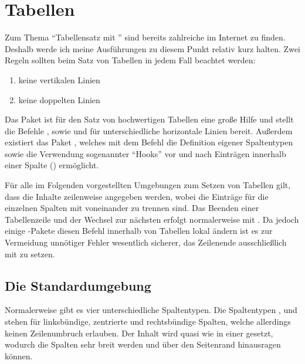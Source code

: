 \documentclass[%
  english,ngerman,%
  geometry=no,DIV=12,automark,%
]{tudscrartcl}
\begin{document}
\section{Tabellen}
\label{sec:tables}
Zum Thema \enquote{Tabellensatz mit } sind bereits zahlreiche 
 im 
Internet zu finden. Deshalb werde ich meine Ausführungen zu diesem Punkt 
relativ kurz halten. Zwei Regeln sollten beim Satz von Tabellen in jedem Fall 
beachtet werden:
%
\begin{enumerate}[itemindent=0pt,labelwidth=*,labelsep=1em,label=\Roman*.]
\item keine vertikalen Linien
\item keine doppelten Linien
\end{enumerate}
%
Das Paket  ist für den Satz von hochwertigen Tabellen eine 
große Hilfe und stellt die Befehle ,  sowie
 und  für unterschiedliche horizontale Linien 
bereit. Außerdem existiert das Paket , welches mit dem Befehl 
 die Definition eigener Spaltentypen sowie die Verwendung 
sogenannter \enquote{Hooks} vor und nach Einträgen innerhalb einer Spalte 
(\PValue{>\{\dots\}}\PValue{<\{\dots\}}) ermöglicht.

Für alle im Folgenden vorgestellten Umgebungen zum Setzen von Tabellen gilt, 
dass die Inhalte zeilenweise angegeben werden, wobei die Einträge für die 
einzelnen Spalten mit \PValue{\&} voneinander zu trennen sind. Das Beenden 
einer Tabellenzeile und der Wechsel zur nächsten erfolgt normalerweise mit 
\Macro{\bsc}. Da jedoch einige -Pakete diesen Befehl innerhalb 
von Tabellen lokal ändern ist es zur Vermeidung unnötiger Fehler wesentlich 
sicherer, das Zeilenende ausschließlich mit  zu setzen.

\subsection{Die Standardumgebung }
Normalerweise gibt es vier unterschiedliche Spaltentypen. Die Spaltentypen 
,  und  stehen für linksbündige, zentrierte und 
rechtsbündige Spalten, welche allerdings keinen Zeilenumbruch erlauben. Der 
Inhalt wird quasi wie in einer  gesetzt, wodurch die Spalten sehr 
breit werden und über den Seitenrand hinausragen können.
\end{document}
